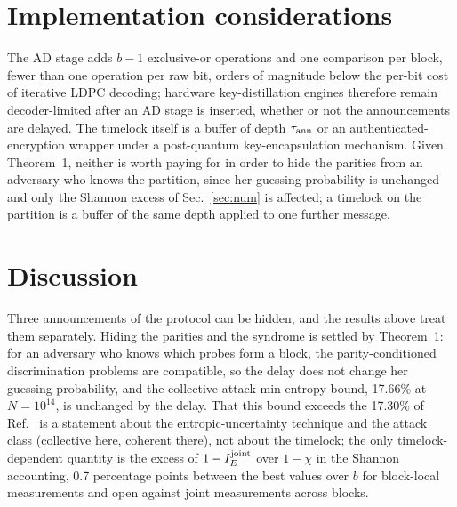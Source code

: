 \documentclass[aps,pra,twocolumn,superscriptaddress,nofootinbib]{revtex4-2}
\begin{document}
\section{Implementation considerations}
The AD stage adds $b-1$ exclusive-or operations and one comparison per block, fewer than one operation per raw bit, orders of magnitude below the per-bit cost of iterative LDPC decoding; hardware key-distillation engines \cite{Walenta14,Constantin17,Cheng25} therefore remain decoder-limited after an AD stage is inserted, whether or not the announcements are delayed. The timelock itself is a buffer of depth $\tau_{\rm ann}$ or an authenticated-encryption wrapper under a post-quantum key-encapsulation mechanism. Given Theorem~1, neither is worth paying for in order to hide the parities from an adversary who knows the partition, since her guessing probability is unchanged and only the Shannon excess of Sec.~\ref{sec:num} is affected; a timelock on the partition is a buffer of the same depth applied to one further message.
\section{Discussion}\label{sec:disc}
Three announcements of the protocol can be hidden, and the results above treat them separately. Hiding the parities and the syndrome is settled by Theorem~1: for an adversary who knows which probes form a block, the parity-conditioned discrimination problems are compatible, so the delay does not change her guessing probability, and the collective-attack min-entropy bound, 17.66\% at $N=10^{14}$, is unchanged by the delay. That this bound exceeds the 17.30\% of Ref.~\cite{T25} is a statement about the entropic-uncertainty technique and the attack class (collective here, coherent there), not about the timelock; the only timelock-dependent quantity is the excess of $1-I_E^{\rm joint}$ over $1-\chi$ in the Shannon accounting, 0.7 percentage points between the best values over $b$ for block-local measurements and open against joint measurements across blocks.
\end{document}
